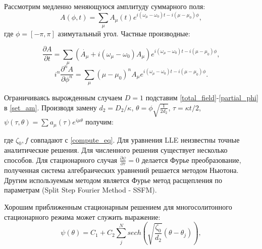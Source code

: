 Рассмотрим медленно меняющуюся амплитуду суммарного поля:
\begin{equation}\label{total_field}
A(\phi,t)=\sum_\mu A_\mu(t)e^{i(\omega_\mu-\omega_0)t-i(\mu-\mu_0)\phi},
\end{equation}
где $\phi=[-\pi,\pi]$ азимутальный угол. Частные производные:

\begin{equation}\label{partial_t}
\frac{\partial A}{\partial t}=\sum_\mu(\dot{A_\mu}+i(\omega_\mu-\omega_0)A_\mu)e^{i(\omega_\mu-\omega_0)t-i(\mu-\mu_0)\phi},
\end{equation}
\begin{equation}\label{partial_phi}
i^n\frac{\partial^n A}{\partial \phi^n}=\sum_\mu(\mu-\mu_0)^n A_\mu e^{i(\omega_\mu-\omega_0)t-i(\mu-\mu_0)\phi}.
\end{equation}

Ограничиваясь вырожденным случаем $D=1$ подставим \eqref{total_field}-\eqref{partial_phi} в \eqref{set_am}. Производя замену $d_2=D_2/\kappa$, $\theta=\phi\sqrt{\frac{1}{2d_2}}$, $\tau=\kappa t/2$, $\psi(\tau,\theta)=\sum a_\mu(\tau)e^{i\mu\theta}$ получим:

%

где $\zeta_0, f$ совпадают с \eqref{compute_eq}. Для уравнения LLE неизвестны точные аналитические решения. Для численного решения существует несколько способов. Для стационарного случая \cite{Akhmediev2005} $\frac{\partial \psi}{\partial \tau}=0$ делается Фурье преобразование, полученная система алгебраических уравнений решается методом Ньютона. Другим используемым методом является Фурье метод расщепления по параметрам (Split Step Fourier Method - SSFM).

Хорошим приближенным стационарным решением для многосолитонного стационарного режима может служить выражение:
\begin{equation}\label{LLE_multisoliton}
\psi(\theta)=C_1+C_2\sum_j^N sech(\sqrt{\frac{\zeta_0}{d_2}}(\theta-\theta_j)),
\end{equation}

